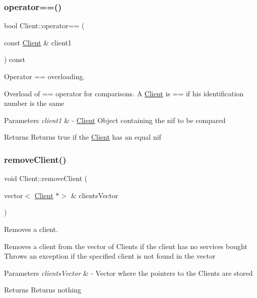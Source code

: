 \subsubsection{\texorpdfstring{operator==()}{operator==()}}
{\footnotesize\ttfamily bool Client\+::operator== (\begin{DoxyParamCaption}\item[{const \hyperlink{class_client}{Client} \&}]{client1 }\end{DoxyParamCaption}) const}



Operator == overloading. 

Overload of == operator for comparisons. A \hyperlink{class_client}{Client} is == if his identification number is the same


\begin{DoxyParams}{Parameters}
{\em client1} & -\/ \hyperlink{class_client}{Client} Object containing the nif to be compared \\
\hline
\end{DoxyParams}
\begin{DoxyReturn}{Returns}
Returns true if the \hyperlink{class_client}{Client} has an equal nif 
\end{DoxyReturn}
\mbox{\label{class_client_a7f845c33f4aa7b7081ae72d9a16c2d3f}} 
\subsubsection{\texorpdfstring{remove\+Client()}{removeClient()}}
{\footnotesize\ttfamily void Client\+::remove\+Client (\begin{DoxyParamCaption}\item[{vector$<$ \hyperlink{class_client}{Client} $\ast$$>$ \&}]{clients\+Vector }\end{DoxyParamCaption})}



Removes a client. 

Removes a client from the vector of Clients if the client has no services bought Throws an exception if the specified client is not found in the vector


\begin{DoxyParams}{Parameters}
{\em clients\+Vector} & -\/ Vector where the pointers to the Clients are stored \\
\hline
\end{DoxyParams}
\begin{DoxyReturn}{Returns}
Returns nothing 
\end{DoxyReturn}
\mbox{\label{class_client_a018c06770de617bb404151e499206355}} 

